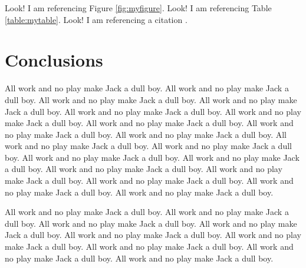 Look! I am referencing Figure \ref{fig:myfigure}.
Look! I am referencing Table \ref{table:mytable}.
Look! I am referencing a citation \cite{areference}.

\section{Conclusions}

All work and no play make Jack a dull boy.
All work and no play make Jack a dull boy.
All work and no play make Jack a dull boy.
All work and no play make Jack a dull boy.
All work and no play make Jack a dull boy.
All work and no play make Jack a dull boy.
All work and no play make Jack a dull boy.
All work and no play make Jack a dull boy.
All work and no play make Jack a dull boy.
All work and no play make Jack a dull boy.
All work and no play make Jack a dull boy.
All work and no play make Jack a dull boy.
All work and no play make Jack a dull boy.
All work and no play make Jack a dull boy.
All work and no play make Jack a dull boy.
All work and no play make Jack a dull boy.
All work and no play make Jack a dull boy.
All work and no play make Jack a dull boy.

All work and no play make Jack a dull boy.
All work and no play make Jack a dull boy.
All work and no play make Jack a dull boy.
All work and no play make Jack a dull boy.
All work and no play make Jack a dull boy.
All work and no play make Jack a dull boy.
All work and no play make Jack a dull boy.
All work and no play make Jack a dull boy.
All work and no play make Jack a dull boy.
